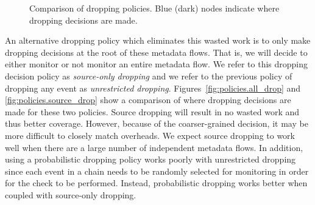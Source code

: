 \begin{figure}
\begin{center}
{    \label{fig:policies.source_drop}
  }
  \vspace{-0.1in}
  \end{center}
  \vspace{-0.1in}
  \caption{Comparison of dropping policies. Blue (dark) nodes indicate where
  dropping decisions are made.}
  \label{fig:policies.policies}
\end{figure}

An alternative dropping policy which eliminates this wasted work is to only make dropping decisions at
the root of these metadata flows. That is, we will decide to either monitor or
not monitor an entire metadata flow. We refer to this dropping decision policy
as \emph{source-only dropping} and we refer to the previous policy of 
dropping any event as \emph{unrestricted dropping}.
Figures~\ref{fig:policies.all_drop} and \ref{fig:policies.source_drop} show a
comparison of where dropping decisions are made for these two policies. Source
dropping will
result in no wasted work and thus better coverage. However, because of the coarser-grained decision, it
may be more difficult to closely match overheads. We expect source dropping 
to work well when there are a large number of independent metadata flows.
In addition, using a probabilistic dropping policy works poorly with
unrestricted dropping since each event in a chain needs to be randomly selected
for monitoring in order for the check to be performed. Instead, probabilistic
dropping works better when coupled with source-only dropping.

